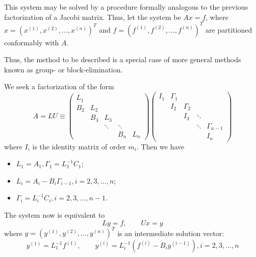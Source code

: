 \documentclass[../main.tex]{subfiles}
\begin{document}
This system may be solved by a procedure formally analogous to the previous factorization of a Jacobi matrix. Thus, let the system be $A x = f$, where $x = (x^{(1)}, x^{(2)}, \ldots, x^{(n)})^T$ and $f = (f^{(1)}, f^{(2)}, \ldots, f^{(n)})^T$ are partitioned conformably with $A$.
\begin{remark}
	Thus, the method to be described is a special case of more general methods known as group- or block-elimination.
\end{remark}

We seek a factorization of the form
\begin{equation}
	A = LU \equiv \begin{pmatrix}
		L_1 &     &        &        &     \\
		B_2 & L_2 &        &        &     \\
		    & B_3 & L_3    &        &     \\
		    &     & \ddots & \ddots &     \\
		    &     &        & B_n    & L_n
	\end{pmatrix} \begin{pmatrix}
		I_1 & \Gamma_1 &          &        &              \\
		    & I_2      & \Gamma_2 &        &              \\
		    &          & I_3      & \ddots &              \\
		    &          &          & \ddots & \Gamma_{n-1} \\
		    &          &          &        & I_n
	\end{pmatrix}
\end{equation}
where $I_i$ is the identity matrix of order $m_i$. Then we have
\begin{itemize}
	\item $L_1 = A_1, \Gamma_1 = L_1^{-1} C_1$;
	\item $L_i = A_i - B_i \Gamma_{i-1}, i = 2, 3, \ldots, n$;
	\item $\Gamma_i = L_i^{-1} C_i, i = 2, 3, \ldots, n-1$.
\end{itemize}
The system now is equivalent to
\begin{equation*}
	L y = f, \qquad U x = y
\end{equation*}
where $y = (y^{(1)}, y^{(2)}, \ldots, y^{(n)})^T$ is an intermediate solution vector:
\begin{equation*}
	y^{(1)} = L_1^{-1} f^{(1)}, \qquad y^{(i)} = L_i^{-1} (f^{(i)} - B_i y^{(i-1)}), i = 2, 3, \ldots, n
\end{equation*}
\end{document}
